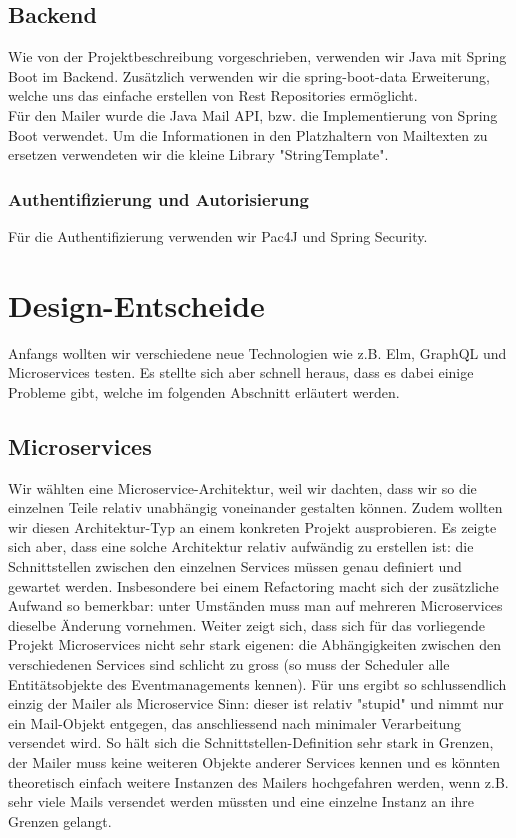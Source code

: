 \documentclass[11pt]{article} %
\begin{document}
\subsection{Backend}
Wie von der Projektbeschreibung vorgeschrieben, verwenden wir Java mit Spring Boot im Backend. Zusätzlich verwenden wir die spring-boot-data Erweiterung, welche uns das einfache erstellen von Rest Repositories ermöglicht.
\\
Für den Mailer wurde die Java Mail API, bzw. die Implementierung von Spring Boot verwendet. Um die Informationen in den Platzhaltern von Mailtexten zu ersetzen verwendeten wir die kleine Library "StringTemplate".

\subsubsection{Authentifizierung und Autorisierung}
Für die Authentifizierung verwenden wir Pac4J und Spring Security. 

\newpage
\section{Design-Entscheide}
Anfangs wollten wir verschiedene neue Technologien wie z.B. Elm, GraphQL und Microservices testen. Es stellte sich aber schnell heraus, dass es dabei einige Probleme gibt, welche im folgenden Abschnitt erläutert werden.

\subsection{Microservices}
Wir wählten eine Microservice-Architektur, weil wir dachten, dass wir so die einzelnen Teile relativ unabhängig voneinander gestalten können. Zudem wollten wir diesen Architektur-Typ an einem konkreten Projekt ausprobieren. Es zeigte sich aber, dass eine solche Architektur relativ aufwändig zu erstellen ist: die Schnittstellen zwischen den einzelnen Services müssen genau definiert und gewartet werden. Insbesondere bei einem Refactoring macht sich der zusätzliche Aufwand so bemerkbar: unter Umständen muss man auf mehreren Microservices dieselbe Änderung vornehmen. Weiter zeigt sich, dass sich für das vorliegende Projekt Microservices nicht sehr stark eigenen: die Abhängigkeiten zwischen den verschiedenen Services sind schlicht zu gross (so muss der Scheduler alle Entitätsobjekte des Eventmanagements kennen). Für uns ergibt so schlussendlich einzig der Mailer als Microservice Sinn: dieser ist relativ "stupid" und nimmt nur ein Mail-Objekt entgegen, das anschliessend nach minimaler Verarbeitung versendet wird. So hält sich die Schnittstellen-Definition sehr stark in Grenzen, der Mailer muss keine weiteren Objekte anderer Services kennen und es könnten theoretisch einfach weitere Instanzen des Mailers hochgefahren werden, wenn z.B. sehr viele Mails versendet werden müssten und eine einzelne Instanz an ihre Grenzen gelangt.
\end{document}
